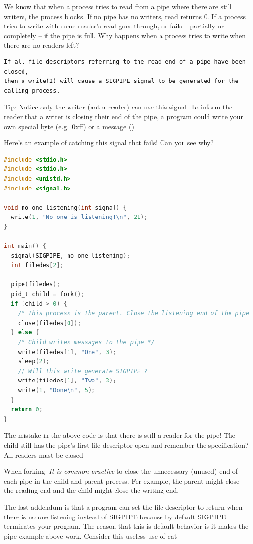 We know that when a process tries to read from a pipe where there are still writers, the process blocks.
If no pipe has no writers, read returns 0.
If a process tries to write with some reader's read goes through, or fails -- partially or completely -- if the pipe is full.
Why happens when a process tries to write when there are no readers left?

\begin{verbatim}
If all file descriptors referring to the read end of a pipe have been closed,
then a write(2) will cause a SIGPIPE signal to be generated for the calling process.
\end{verbatim}

Tip: Notice only the writer (not a reader) can use this signal.
To inform the reader that a writer is closing their end of the pipe, a program could write your own special byte (e.g.~0xff) or a message ()

Here's an example of catching this signal that fails! Can you see why?

\begin{lstlisting}[language=C]
#include <stdio.h>
#include <stdio.h>
#include <unistd.h>
#include <signal.h>

void no_one_listening(int signal) {
  write(1, "No one is listening!\n", 21);
}

int main() {
  signal(SIGPIPE, no_one_listening);
  int filedes[2];

  pipe(filedes);
  pid_t child = fork();
  if (child > 0) {
    /* This process is the parent. Close the listening end of the pipe */
    close(filedes[0]);
  } else {
    /* Child writes messages to the pipe */
    write(filedes[1], "One", 3);
    sleep(2);
    // Will this write generate SIGPIPE ?
    write(filedes[1], "Two", 3);
    write(1, "Done\n", 5);
  }
  return 0;
}
\end{lstlisting}

The mistake in the above code is that there is still a reader for the pipe!
The child still has the pipe's first file descriptor open and remember the specification? All readers must be closed

When forking, \emph{It is common practice} to close the unnecessary (unused) end of each pipe in the child and parent process.
For example, the parent might close the reading end and the child might close the writing end.

The last addendum is that a program can set the file descriptor to return when there is no one listening instead of SIGPIPE because by default SIGPIPE terminates your program.
The reason that this is default behavior is it makes the pipe example above work.
Consider this useless use of cat

